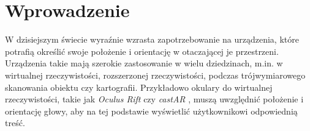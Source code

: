 
\chapter*{Wprowadzenie}

W dzisiejszym świecie wyraźnie wzrasta zapotrzebowanie na urządzenia,
które potrafią określić swoje położenie i orientację w otaczającej je przestrzeni.
Urządzenia takie mają szerokie zastosowanie w wielu dziedzinach, m.in. w
wirtualnej rzeczywistości, rozszerzonej rzeczywistości, 
 podczas trójwymiarowego skanowania obiektu czy kartografii.
Przykładowo okulary do wirtualnej rzeczywistości, takie jak \textit{Oculus Rift} \cite{bib:OculusRift} 
czy \textit{castAR} \cite{bib:castAR},
muszą uwzględnić położenie i orientację głowy, aby na tej podstawie wyświetlić użytkownikowi 
odpowiednią treść. 


